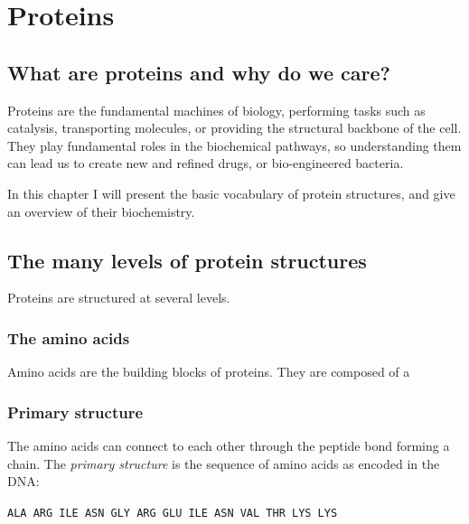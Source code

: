 \chapter{Proteins}
\section{What are proteins and why do we care?}
Proteins are the fundamental machines of biology, performing tasks such as catalysis, transporting molecules, or providing the structural backbone of the cell.
They play fundamental roles in the biochemical pathways, so understanding them can lead us to create new and refined drugs,
or bio-engineered bacteria.

In this chapter I will present the basic vocabulary of protein structures, and give an overview of their biochemistry.

\section{The many levels of protein structures}
Proteins are structured at several levels.
\subsection{The amino acids}
Amino acids are the building blocks of proteins.
They are composed of a

\label{fig:amino_acid}

\subsection{Primary structure}
The amino acids can connect to each other through the peptide bond forming a chain.
The \emph{primary structure} is the sequence of amino acids as encoded in the DNA:
\begin{center}
\texttt{ALA ARG ILE ASN GLY ARG GLU ILE ASN VAL THR LYS LYS}
\end{center}

